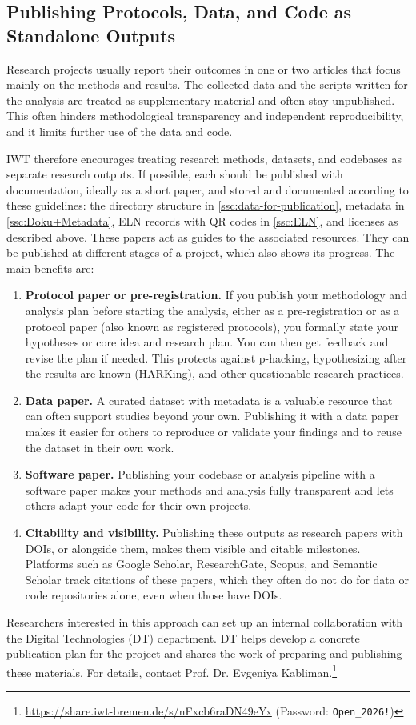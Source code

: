 \subsection{Publishing Protocols, Data, and Code as Standalone Outputs}
\label{sec:standalone-outputs}

Research projects usually report their outcomes in one or two articles that focus
mainly on the methods and results. The collected data and the scripts written for the
analysis are treated as supplementary material and often stay unpublished. This often
hinders methodological transparency and independent reproducibility, and it limits
further use of the data and code.

IWT therefore encourages treating research methods, datasets, and codebases as separate
research outputs. If possible, each should be published with documentation, ideally as
a short paper, and stored and documented according to these guidelines: the directory
structure in \autoref{ssc:data-for-publication}, metadata in \autoref{ssc:Doku+Metadata}, ELN records with QR codes in \autoref{ssc:ELN}, and licenses as described above. These papers act as guides to the associated
resources. They can be published at different stages of a project, which also shows its
progress. The main benefits are:

\begin{enumerate}
	\item \textbf{Protocol paper or pre-registration.} If you publish your methodology
	and analysis plan before starting the analysis, either as a pre-registration or as a
	protocol paper (also known as registered protocols), you formally state your
	hypotheses or core idea and research plan. You can then get feedback and revise the
	plan if needed. This protects against p-hacking, hypothesizing after the results are
	known (HARKing), and other questionable research practices.
	\item \textbf{Data paper.} A curated dataset with metadata is a valuable resource
	that can often support studies beyond your own. Publishing it with a data paper makes
	it easier for others to reproduce or validate your findings and to reuse the dataset
	in their own work.
	\item \textbf{Software paper.} Publishing your codebase or analysis pipeline with a
	software paper makes your methods and analysis fully transparent and lets others
	adapt your code for their own projects.
	\item \textbf{Citability and visibility.} Publishing these outputs as research papers
	with DOIs, or alongside them, makes them visible and citable milestones. Platforms
	such as Google Scholar, ResearchGate, Scopus, and Semantic Scholar track citations of
	these papers, which they often do not do for data or code repositories alone, even
	when those have DOIs.
\end{enumerate}

Researchers interested in this approach can set up an internal collaboration with the
Digital Technologies (DT) department. DT helps develop a concrete publication plan for
the project and shares the work of preparing and publishing these materials. For
details, contact Prof. Dr. Evgeniya Kabliman.\footnote{%
	\url{https://share.iwt-bremen.de/s/nFxcb6raDN49eYx}
	(Password: \texttt{Open\_2026!})}
